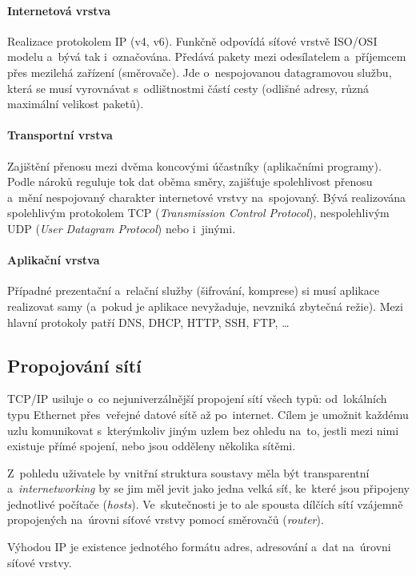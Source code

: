\paragraph{Internetová vrstva} Realizace protokolem IP (v4, v6). Funkčně odpovídá síťové vrstvě ISO/OSI modelu a~bývá tak i~označována. Předává pakety mezi odesílatelem a~příjemcem přes mezilehá zařízení (směrovače). Jde o~nespojovanou datagramovou službu, která se musí vyrovnávat s~odlištnostmi částí cesty (odlišné adresy, různá maximální velikost paketů).

\paragraph{Transportní vrstva} Zajištění přenosu mezi dvěma koncovými účastníky (aplikačními programy). Podle nároků reguluje tok dat oběma směry, zajišťuje spolehlivost přenosu a~mění nespojovaný charakter internetové vrstvy na~spojovaný. Bývá realizována spolehlivým protokolem TCP (\emph{Transmission Control Protocol}), nespolehlivým UDP (\emph{User Datagram Protocol}) nebo i~jinými.

\paragraph{Aplikační vrstva} Případné prezentační a~relační služby (šifrování, komprese) si musí aplikace realizovat samy (a~pokud je aplikace nevyžaduje, nevzniká zbytečná režie). Mezi hlavní protokoly patří DNS, DHCP, HTTP, SSH, FTP, \dots

\subsection{Propojování sítí}

TCP/IP usiluje o~co nejuniverzálnější propojení sítí všech typů: od~lokálních typu Ethernet přes~veřejné datové sítě až po~internet. Cílem je umožnit každému uzlu komunikovat s~kterýmkoliv jiným uzlem bez ohledu na~to, jestli mezi nimi existuje přímé spojení, nebo jsou odděleny několika sítěmi.

Z~pohledu uživatele by vnitřní struktura soustavy měla být transparentní a~\emph{internetworking} by se jim měl jevit jako jedna velká síť, ke~které jsou připojeny jednotlivé počítače (\emph{hosts}). Ve~skutečnosti je to ale spousta dílčích sítí vzájemně propojených na~úrovni síťové vrstvy pomocí směrovačů (\emph{router}).

Výhodou IP je existence jednotého formátu adres, adresování a~dat na~úrovni síťové vrstvy.

